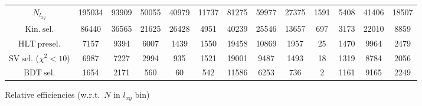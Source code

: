 \documentclass[10pt,a4paper]{article}
\begin{document}
\begin{landscape}
{\begin{tabular}{c|cccc|cccc|cccc}
\midrule
$N_{l_{xy}}$ & 195034 & 93909 & 50055 & 40979 & 11737 & 81275 & 59977 & 27375 & 1591 & 5408 & 41406 & 18507\\
$\mathrm{Kin.\ sel.}$ & 86440 & 36565 & 21625 & 26428 & 4951 & 40239 & 25546 & 13657 & 697 & 3173 & 22010 & 8859\\
$\mathrm{HLT\ presel.}$ & 7157 & 9394 & 6007 & 1439 & 1550 & 19458 & 10869 & 1957 & 25 & 1470 & 9964 & 2479\\
$\mathrm{SV\ sel.}$ ($\chi^2{<}10$) & 6987 & 7227 & 2994 & 935 & 1521 & 19001 & 9487 & 1493 & 18 & 1319 & 8784 & 2056\\
$\mathrm{BDT\ sel.}$ & 1654 & 2171 & 560 & 60 & 542 & 11586 & 6253 & 736 & 2 & 1161 & 9165 & 2249\\
\bottomrule
\end{tabular}}

\vspace{18pt}

Relative efficiencies (w.r.t.\ $N$ in $l_{xy}$ bin)


\end{landscape}
\end{document}
